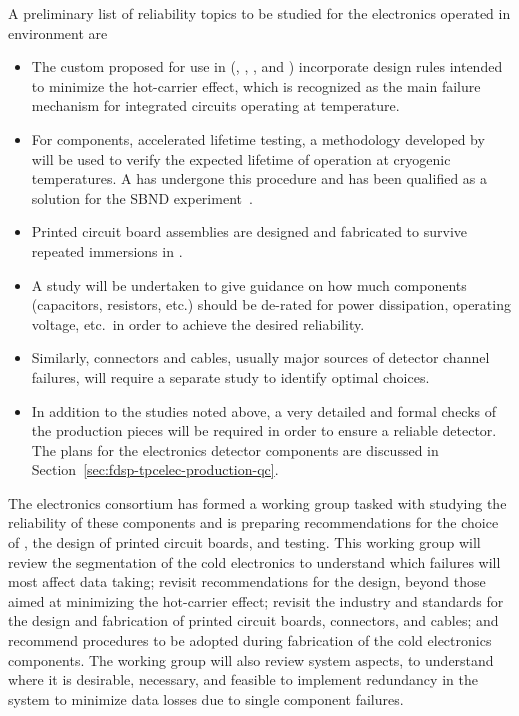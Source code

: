 A preliminary list of reliability topics to be studied for the  electronics operated 
in  environment are
\begin{itemize}
\item The custom  proposed for use in  (, 
, , and ) incorporate design rules 
intended to minimize the hot-carrier effect\cite{Li:CELAr,Hoff:2015hax}, 
which is recognized as the main failure mechanism for integrated circuits 
operating at  temperature.
\item For  components, accelerated lifetime testing, a methodology 
developed by ~\cite{nasa_nepp} will be used to verify the expected
lifetime of operation at cryogenic temperatures. A   has undergone
this procedure and has been qualified as a solution for the SBND experiment~\cite{Chen:2018zic}.
\item Printed circuit board assemblies are designed and fabricated to survive 
repeated immersions in \lntwo.
\item A study will be undertaken to give guidance on how much components (capacitors,
resistors, etc.) should be de-rated for power dissipation, operating voltage, etc.~in
order to achieve the desired reliability.
\item Similarly, connectors and cables, usually major sources of detector channel failures,
will require a separate study to identify optimal choices.
\item In addition to the  studies noted above, a very detailed
and formal  checks of the production pieces will be required in order to ensure
a reliable detector. The  plans for the  electronics
detector components are discussed in Section~\ref{sec:fdsp-tpcelec-production-qc}.
\end{itemize}
The  electronics consortium has formed a working group tasked with studying the reliability  
of these components and is preparing recommendations for the choice of , 
the design of printed circuit boards, and testing. This working group will review the 
segmentation of the cold electronics to understand which failures will most affect data taking; revisit recommendations for the  design, 
beyond those aimed at minimizing the hot-carrier effect; revisit the industry and 
 standards for the design and fabrication of printed circuit boards, connectors, 
and cables; and recommend  procedures to be adopted during 
fabrication of the cold electronics components. The working group will also review
system aspects, to understand where it is desirable, necessary, and feasible to implement 
redundancy in the system to minimize data losses due to single component failures. 
